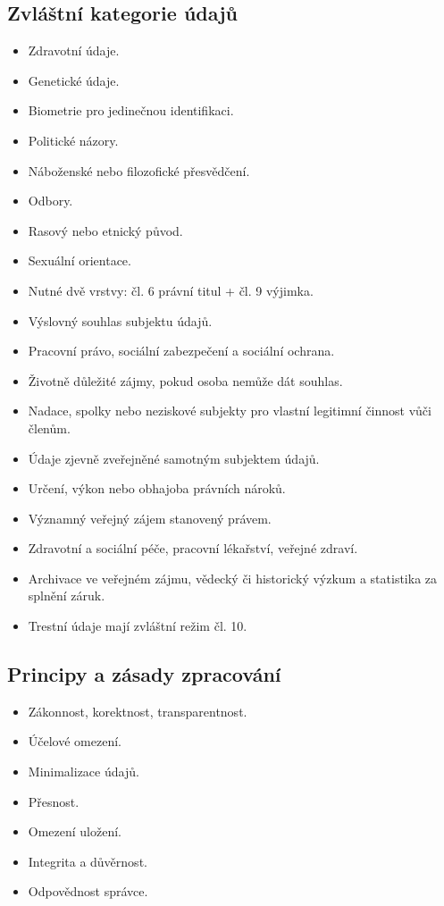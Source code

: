 \documentclass[10pt,a4paper]{article}
\newcommand{\blok}[1]{\subsection*{#1}}
\begin{document}
\blok{Zvláštní kategorie údajů}
\begin{itemize}
  \item Zdravotní údaje.
  \item Genetické údaje.
  \item Biometrie pro jedinečnou identifikaci.
  \item Politické názory.
  \item Náboženské nebo filozofické přesvědčení.
  \item Odbory.
  \item Rasový nebo etnický původ.
  \item Sexuální orientace.
  \item Nutné dvě vrstvy: čl. 6 právní titul + čl. 9 výjimka.
  \item Výslovný souhlas subjektu údajů.
  \item Pracovní právo, sociální zabezpečení a sociální ochrana.
  \item Životně důležité zájmy, pokud osoba nemůže dát souhlas.
  \item Nadace, spolky nebo neziskové subjekty pro vlastní legitimní činnost vůči členům.
  \item Údaje zjevně zveřejněné samotným subjektem údajů.
  \item Určení, výkon nebo obhajoba právních nároků.
  \item Významný veřejný zájem stanovený právem.
  \item Zdravotní a sociální péče, pracovní lékařství, veřejné zdraví.
  \item Archivace ve veřejném zájmu, vědecký či historický výzkum a statistika za splnění záruk.
  \item Trestní údaje mají zvláštní režim čl. 10.
\end{itemize}

\blok{Principy a zásady zpracování}
\begin{itemize}
  \item Zákonnost, korektnost, transparentnost.
  \item Účelové omezení.
  \item Minimalizace údajů.
  \item Přesnost.
  \item Omezení uložení.
  \item Integrita a důvěrnost.
  \item Odpovědnost správce.
\end{itemize}
\end{document}
